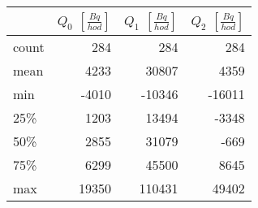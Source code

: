 \begin{tabular}{lrrr}
\toprule
{} &  $Q_0$ $\left[\si{\frac{Bq}{hod}}\right]$ &  $Q_1$ $\left[\si{\frac{Bq}{hod}}\right]$ &  $Q_2$ $\left[\si{\frac{Bq}{hod}}\right]$ \\
\midrule
count &                                       284 &                                       284 &                                       284 \\
mean  &                                      4233 &                                     30807 &                                      4359 \\
min   &                                     -4010 &                                    -10346 &                                    -16011 \\
25\%   &                                      1203 &                                     13494 &                                     -3348 \\
50\%   &                                      2855 &                                     31079 &                                      -669 \\
75\%   &                                      6299 &                                     45500 &                                      8645 \\
max   &                                     19350 &                                    110431 &                                     49402 \\
\bottomrule
\end{tabular}
